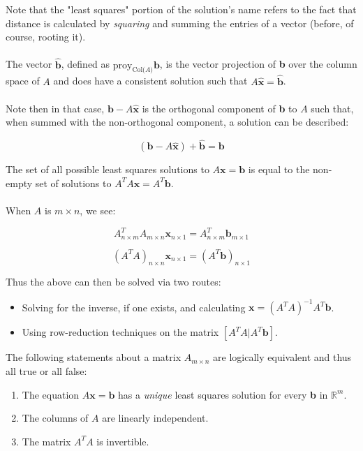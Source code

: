 \documentclass[12pt]{article}
\newcommand{\R}{\mathbb{R}}
\newcommand{\bt}[1]{\textbf{{#1}}}
\newcommand{\bm}[1]{\mathbf{{#1}}}
\begin{document}
Note that the "least squares" portion of the solution's name refers to the fact
that distance is calculated by \emph{squaring} and summing the entries of a vector
(before, of course, rooting it). \\ \\

The vector $\bm{\hat{b}}$, defined as $\textrm{proy}_{\textrm{Col($A$)}}\bm{b}$, is the vector
projection of \bt{b} over the column space of $A$ and does have a consistent solution such that $A\bm{\hat{x}} = \bm{\hat{b}}$. \\ \\

Note then in that case, $\bm{b} - A\bm{\hat{x}}$ is the orthogonal component of \bt{b}
to $A$ such that, when summed with the non-orthogonal component, a solution can be described:

$$(\bm{b} - A\bm{\hat{x}}) + \bm{\hat{b}} = \bm{b}$$

The set of all possible least squares solutions to $A\bm{x} = \bm{b}$ is equal to the
non-empty set of solutions to $A^T A\bm{x} = A^T \bm{b}$. \\ \\

When $A$ is $m \times n$, we see:


$$A^T_{n \times m} A_{m \times n}\bm{x}_{n \times 1} = A^T_{n \times m} \bm{b}_{m \times 1}$$

$$(A^T A)_{n \times n} \bm{x}_{n \times 1} = (A^T \bm{b})_{n \times 1}$$

Thus the above can then be solved via two routes:

\begin{itemize}
    \item Solving for the inverse, if one exists, and calculating $\bm{x} = (A^T A)^{-1} A^T \bm{b}$.
    \item Using row-reduction techniques on the matrix $[A^T A | A^T\bm{b}]$.
\end{itemize}

The following statements about a matrix $A_{m \times n}$ are logically equivalent and
thus all true or all false:

\begin{enumerate}
    \item The equation $A\bm{x = b}$ has a \emph{unique} least squares solution for every \bt{b} in $\R^m$.
    \item The columns of $A$ are linearly independent.
    \item The matrix $A^T A$ is invertible.
\end{enumerate}
\end{document}
